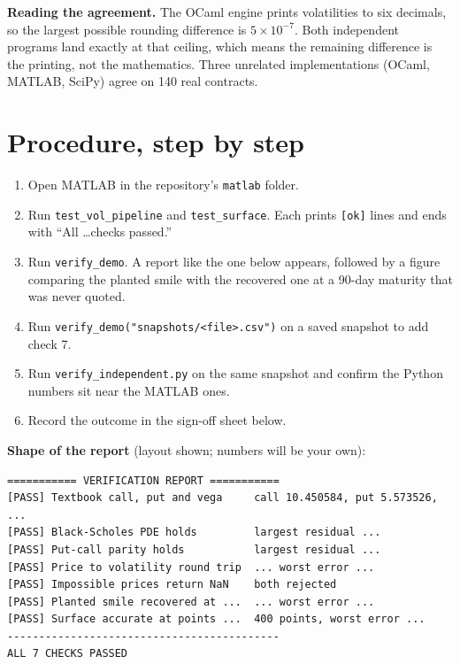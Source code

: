 \documentclass[11pt]{article}
\begin{document}
\textbf{Reading the agreement.} The OCaml engine prints volatilities to six decimals, so the largest possible rounding difference is $5\times10^{-7}$. Both independent programs land exactly at that ceiling, which means the remaining difference is the printing, not the mathematics. Three unrelated implementations (OCaml, MATLAB, SciPy) agree on 140 real contracts.

\section{Procedure, step by step}
\begin{enumerate}[leftmargin=1.5em]
\item Open MATLAB in the repository's \texttt{matlab} folder.
\item Run \texttt{test\_vol\_pipeline} and \texttt{test\_surface}. Each prints \texttt{[ok]} lines and ends with ``All \ldots checks passed.''
\item Run \texttt{verify\_demo}. A report like the one below appears, followed by a figure comparing the planted smile with the recovered one at a 90-day maturity that was never quoted.
\item Run \texttt{verify\_demo("snapshots/<file>.csv")} on a saved snapshot to add check 7.
\item Run \texttt{verify\_independent.py} on the same snapshot and confirm the Python numbers sit near the MATLAB ones.
\item Record the outcome in the sign-off sheet below.
\end{enumerate}

\textbf{Shape of the report} (layout shown; numbers will be your own):
\begin{lstlisting}
=========== VERIFICATION REPORT ===========
[PASS] Textbook call, put and vega     call 10.450584, put 5.573526, ...
[PASS] Black-Scholes PDE holds         largest residual ...
[PASS] Put-call parity holds           largest residual ...
[PASS] Price to volatility round trip  ... worst error ...
[PASS] Impossible prices return NaN    both rejected
[PASS] Planted smile recovered at ...  ... worst error ...
[PASS] Surface accurate at points ...  400 points, worst error ...
-------------------------------------------
ALL 7 CHECKS PASSED
\end{lstlisting}
\end{document}
